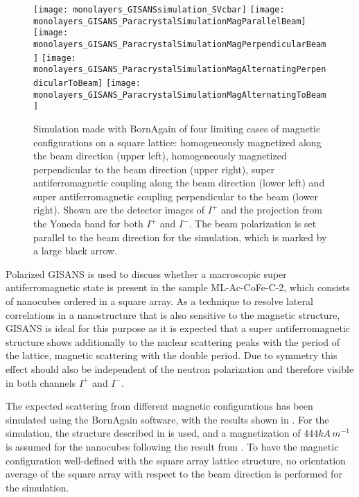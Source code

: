 \documentclass[\main/dresen_thesis.tex]{subfiles}
\begin{document}
  \begin{figure}[htbp]
    \centering
    \texttt{[image: monolayers\_GISANSsimulation\_SVcbar]}
    \texttt{[image: monolayers\_GISANS\_ParacrystalSimulationMagParallelBeam]}
    \texttt{[image: monolayers\_GISANS\_ParacrystalSimulationMagPerpendicularBeam]}
    \texttt{[image: monolayers\_GISANS\_ParacrystalSimulationMagAlternatingPerpendicularToBeam]}
    \texttt{[image: monolayers\_GISANS\_ParacrystalSimulationMagAlternatingToBeam]}
    \caption{\label{fig:monolayers:gisans:simulationAlternating}Simulation made with BornAgain \cite{Burle_2018_borna} of four limiting cases of magnetic configurations on a square lattice: homogeneously magnetized along the beam direction (upper left), homogeneously magnetized perpendicular to the beam direction (upper right), super antiferromagnetic coupling along the beam direction (lower left) and super antiferromagnetic coupling perpendicular to the beam (lower right). Shown are the detector images of $I^{+}$ and the projection from the Yoneda band for both $I^{+}$ and $I^{-}$. The beam polarization is set parallel to the beam direction for the simulation, which is marked by a large black arrow.}
  \end{figure}
  Polarized GISANS is used to discuss whether a macroscopic super antiferromagnetic state is present in the sample ML-Ac-CoFe-C-2, which consists of nanocubes ordered in a square array.
  As a technique to resolve lateral correlations in a nanostructure that is also sensitive to the magnetic structure, GISANS is ideal for this purpose as it is expected that a super antiferromagnetic structure shows additionally to the nuclear scattering peaks with the period of the lattice, magnetic scattering with the double period.
  Due to symmetry this effect should also be independent of the neutron polarization and therefore visible in both channels $I^{+}$ and $I^{-}$.

  The expected scattering from different magnetic configurations has been simulated using the BornAgain software, with the results shown in .
  For the simulation, the structure described in  is used, and a magnetization of $444 \unit{kA \, m^{-1}}$ is assumed for the nanocubes following the result from .
  To have the magnetic configuration well-defined with the square array lattice structure, no orientation average of the square array with respect to the beam direction is performed for the simulation.
\end{document}
